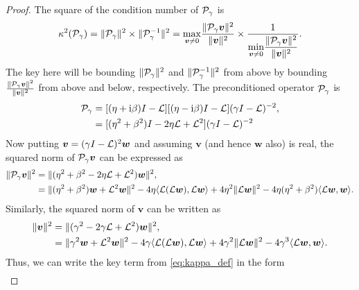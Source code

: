 \documentclass[a4paper,10pt]{article}
\begin{document}
\begin{proof}
The square of the condition number of ${\cal P}_{\gamma}$ is
\begin{align}
\label{eq:kappa_def}
\kappa^2({\cal P}_{\gamma}) 
= 
\Vert {\cal P}_{\gamma} \Vert^2 
\times
\Vert {\cal P}_{\gamma}^{-1} \Vert^2
=
\underset{{\bm{v} \neq 0}}{\max} \frac{\Vert {\cal P}_{\gamma} \bm{v} \Vert^2 }{\Vert \bm{v} \Vert^2} 
\times 
\frac{1}{\displaystyle{\underset{{\bm{v} \neq 0}}{\min} \frac{\Vert {\cal P}_{\gamma} \bm{v} \Vert^2 }{\Vert \bm{v} \Vert^2}}}.
\end{align}
The key here will be bounding $\Vert {\cal P}_{\gamma} \Vert^2$ and $\Vert {\cal P}_{\gamma}^{-1} \Vert^2$ from above by bounding $\frac{\Vert {\cal P}_{\gamma} \bm{v} \Vert^2 }{\Vert \bm{v} \Vert^2}$ from above and below, respectively.
%
The preconditioned operator ${\cal P}_{\gamma}$ is 
\begin{align*}
{\cal P}_{\gamma} 
&= 
[(\eta + \mathrm{i}\beta)I -
\mathcal{L}][(\eta - \mathrm{i}\beta)I - \mathcal{L}] (\gamma I - {\cal L})^{-2}, \\
&=
[(\eta^2 + \beta^2) I - 2 \eta {\cal L} + {\cal L}^2] (\gamma I - {\cal L})^{-2}
\end{align*}
Now putting $\bm{v} = (\gamma I - {\cal L})^{2} \bm{w}$ and assuming $\bm{v}$ (and hence $\bm{w}$ also) is real, the squared norm of ${\cal P}_{\gamma} \bm{v}$ can be expressed as
\begin{align}
\label{eq:norm_Pv}
\Vert {\cal P}_{\gamma} \bm{v} \Vert^2
&=
\Vert ( \eta^2 + \beta^2 - 2\eta{\cal L} + {\cal L}^2 ) \bm{w} \Vert^2, \\
&=
\nonumber
\Vert (\eta^2 + \beta^2) \bm{w} + {\cal L}^2 \bm{w} \Vert^2  - 4 \eta \langle {\cal L}({\cal L} \bm{w}), {\cal L}\bm{w} \rangle + 4 \eta^2 \Vert {\cal L} \bm{w} \Vert^2 - 4 \eta (\eta^2 +\beta^2) \langle {\cal L} \bm{w}, \bm{w} \rangle.
\end{align}
Similarly, the squared norm of $\bm{v}$ can be written as
\begin{align}
\label{eq:norm_v}
\Vert \bm{v} \Vert^2
&=
\Vert ( \gamma^2 - 2\gamma{ \cal L} + {\cal L}^2 ) \bm{w} \Vert^2, \\
&=
\nonumber
\Vert \gamma^2 \bm{w} + {\cal L}^2 \bm{w} \Vert^2  - 4 \gamma \langle {\cal L}({\cal L} \bm{w}), {\cal L}\bm{w} \rangle + 4 \gamma^2 \Vert {\cal L} \bm{w} \Vert^2 - 4 \gamma^3 \langle {\cal L} \bm{w}, \bm{w} \rangle.
\end{align}
Thus, we can write the key term from \eqref{eq:kappa_def} in the form
\begin{align}
\label{eq:P_gamma_frac}

\end{align}
\end{proof}
\end{document}
